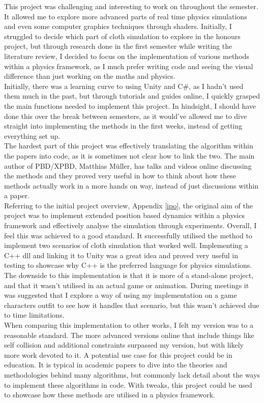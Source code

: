 \documentclass[12pt,a4paper]{article}
\begin{document}
This project was challenging and interesting to work on throughout the semester. It allowed me to explore more advanced parts of real time physics simulations and even some computer graphics techniques through shaders. Initially, I struggled to decide which part of cloth simulation to explore in the honours project, but through research done in the first semester while writing the literature review, I decided to focus on the implementation of various methods within a physics framework, as I much prefer writing code and seeing the visual difference than just working on the maths and physics. \\
Initially, there was a learning curve to using Unity and C\#, as I hadn't used them much in the past, but through tutorials and guides online, I quickly grasped the main functions needed to implement this project. In hindsight, I should have done this over the break between semesters, as it would've allowed me to dive straight into implementing the methods in the first weeks, instead of getting everything set up. \\
The hardest part of this project was effectively translating the algorithm within the papers into code, as it is sometimes not clear how to link the two. The main author of PBD/XPBD, Matthias Müller, has talks and videos online discussing the methods and they proved very useful in how to think about how these methods actually work in a more hands on way, instead of just discussions within a paper. \\

Referring to the initial project overview, Appendix \ref{ipo}, the original aim of the project was to implement extended position based dynamics within a physics framework and effectively analyse the simulation through experiments. Overall, I feel this was achieved to a good standard. It successfully utilised the method to implement two scenarios of cloth simulation that worked well. Implementing a C++ dll and linking it to Unity was a great idea and proved very useful in testing to showcase why C++ is the preferred language for physics simulations. The downside to this implementation is that it is more of a stand-alone project, and that it wasn't utilised in an actual game or animation. During meetings it was suggested that I explore a way of using my implementation on a game characters outfit to see how it handles that scenario, but this wasn't achieved due to time limitations. \\

When comparing this implementation to other works, I felt my version was to a reasonable standard. The more advanced versions online that include things like self collision and additional constraints surpassed my version, but with likely more work devoted to it. A potential use case for this project could be in education. It is typical in academic papers to dive into the theories and methodologies behind many algorithms, but commonly lack detail about the ways to implement these algorithms in code. With tweaks, this project could be used to showcase how these methods are utilised in a physics framework. \\
\end{document}
